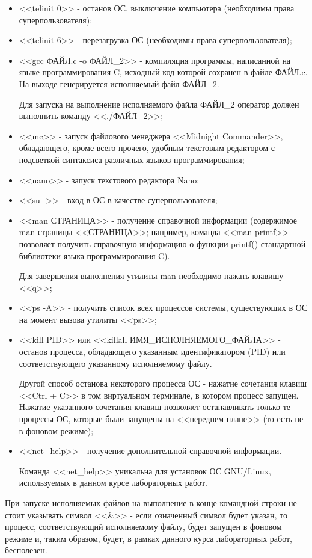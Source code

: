 \begin{itemize}

	\item <<telinit 0>> - останов ОС, выключение компьютера (необходимы права суперпользователя);
	\item <<telinit 6>> - перезагрузка ОС (необходимы права суперпользователя);
	\item <<gcc ФАЙЛ.c -o ФАЙЛ\_2>> - компиляция программы, написанной на языке программирования C, исходный код которой сохранен в файле ФАЙЛ.c. На выходе генерируется исполняемый файл ФАЙЛ\_2.
	
		Для запуска на выполнение исполняемого файла ФАЙЛ\_2 оператор должен выполнить команду <<./ФАЙЛ\_2>>;

	\item <<mc>> - запуск файлового менеджера <<Midnight Commander>>, обладающего, кроме всего прочего, удобным текстовым редактором с подсветкой синтаксиса различных языков программирования;
	\item <<nano>> - запуск текстового редактора Nano;
	\item <<su ->> - вход в ОС в качестве суперпользователя;
	\item <<man СТРАНИЦА>> - получение справочной информации (содержимое man-страницы <<СТРАНИЦА>>; например, команда <<man printf>> позволяет получить справочную информацию о функции printf() стандартной библиотеки языка программирования C).
	
		Для завершения выполнения утилиты man необходимо нажать клавишу <<q>>;

	\item <<ps -A>> - получить список всех процессов системы, существующих в ОС на момент вызова утилиты <<ps>>;

	\item <<kill PID>> или <<killall ИМЯ\_ИСПОЛНЯЕМОГО\_ФАЙЛА>> - останов процесса, обладающего указанным идентификатором (PID) или соответствующего указанному исполняемому файлу.

		Другой способ останова некоторого процесса ОС - нажатие сочетания клавиш <<Ctrl + C>> в том виртуальном терминале, в котором процесс запущен. Нажатие указанного сочетания клавиш позволяет останавливать только те процессы ОС, которые были запущены на <<переднем плане>> (то есть не в фоновом режиме); 

	\item <<net\_help>> - получение дополнительной справочной информации.

		Команда <<net\_help>> уникальна для установок ОС GNU/Linux, используемых в данном курсе лабораторных работ.

\end{itemize}

При запуске исполняемых файлов на выполнение в конце командной строки не стоит указывать символ <<\&>> - если означенный символ будет указан, то процесс, соответствующий исполняемому файлу, будет запущен в фоновом режиме и, таким образом, будет, в рамках данного курса лабораторных работ, бесполезен.


